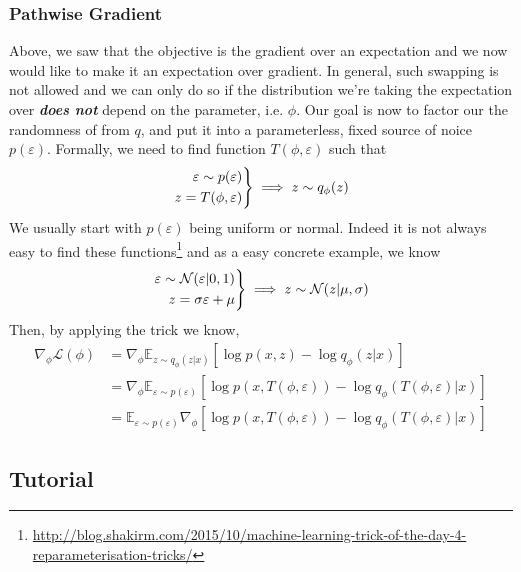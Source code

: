 \documentclass[11pt]{article}
\newenvironment{rcases}
  {\left.\begin{aligned}}
  {\end{aligned}\right\rbrace}
\begin{document}
\subsubsection{Pathwise Gradient}
Above, we saw that the objective is the gradient over an expectation and we now would like to make it an expectation over gradient. In general, such swapping is not allowed and we can only do so if the distribution we're taking the expectation over \textit{\textbf{does not}} depend on the parameter, i.e. $\phi$. Our goal is now to factor our the randomness of from $q$, and put it into a parameterless, fixed source of noice $p(\varepsilon)$. Formally, we need to find function $T(\phi,\varepsilon )$ such that 
\begin{equation}
    \begin{rcases}
        \varepsilon \sim p(\varepsilon ) \\
        z = T(\phi,\varepsilon ) 
    \end{rcases}
    \implies z\sim q_\phi(z)
\end{equation}
We usually start with $p(\varepsilon )$ being uniform or normal. Indeed it is not always easy to find these functions\footnote{\url{http://blog.shakirm.com/2015/10/machine-learning-trick-of-the-day-4-reparameterisation-tricks/}} and as a easy concrete example, we know
\begin{equation}
    \begin{rcases}
        \varepsilon \sim \mathcal{N}(\varepsilon | 0, 1) \\
        z = \sigma \varepsilon + \mu
    \end{rcases}
    \implies z\sim \mathcal{N}(z | \mu, \sigma )
\end{equation}
Then, by applying the trick we know,
\begin{align}
    \nabla_{\phi} \mathcal{L}(\phi)
    &=\nabla_{\phi} \mathbb{E}_{z \sim q_{\phi}(z | x)}\left[\log p(x, z)-\log q_{\phi}(z | x)\right] \\
    &=\nabla_{\phi} \mathbb{E}_{\varepsilon \sim p(\varepsilon)}\left[\log p(x, T(\phi, \varepsilon))-\log q_{\phi}(T(\phi, \varepsilon) | x)\right] \\
    &=\mathbb{E}_{\varepsilon \sim p(\varepsilon)} \nabla_{\phi}\left[\log p(x, T(\phi, \varepsilon))-\log q_{\phi}(T(\phi, \varepsilon) | x)\right]
\end{align}

\subsection{Tutorial}
\end{document}
